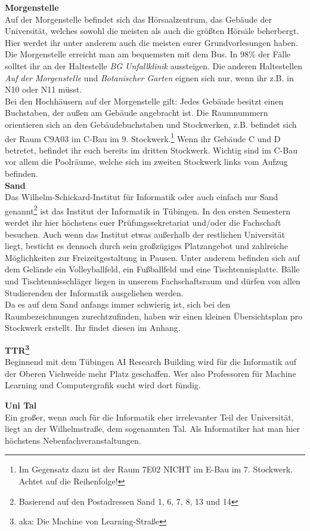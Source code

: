 \textbf{Morgenstelle}\\
Auf der Morgenstelle befindet sich das Hörsaalzentrum, das Gebäude der Universität, welches sowohl die meisten als auch die größten Hörsäle beherbergt. Hier werdet ihr unter anderem auch die meisten eurer Grundvorlesungen haben.\\
Die Morgenstelle erreicht man am bequemsten mit dem Bus. In 98\% der Fälle solltet ihr an der Haltestelle \emph{BG Unfallklinik} aussteigen. Die anderen Haltestellen \emph{Auf der Morgenstelle} und \emph{Botanischer Garten} eignen sich nur, wenn ihr z.B. in N10 oder N11 müsst.\\ Bei den Hochhäusern auf der Morgenstelle gilt: Jedes Gebäude besitzt einen Buchstaben, der außen am Gebäude angebracht ist.  Die Raumnummern orientieren sich an den Gebäudebuchstaben und Stockwerken, z.B. befindet sich der Raum C9A03 im C-Bau im 9. Stockwerk.\footnote{Im Gegensatz dazu ist der Raum 7E02 NICHT im E-Bau im 7. Stockwerk. Achtet auf die Reihenfolge!} Wenn ihr Gebäude C und D betretet, befindet ihr euch bereits im dritten Stockwerk. Wichtig sind im C-Bau vor allem die Poolräume, welche sich im zweiten Stockwerk links vom Aufzug befinden. \\

\textbf{Sand}\\
Das Wilhelm-Schickard-Institut für Informatik oder auch einfach nur Sand genannt\footnote{Basierend auf den Postadressen Sand 1, 6, 7, 8, 13 und 14} ist das Institut der Informatik in Tübingen. In den ersten Semestern werdet ihr hier höchstens euer Prüfungssekretariat und/oder die Fachschaft besuchen. Auch wenn das Institut etwas außerhalb der restlichen Universität liegt, besticht es dennoch durch sein großzügiges Platzangebot und zahlreiche Möglichkeiten zur Freizeitgestaltung in Pausen. Unter anderem befinden sich auf dem Gelände ein Volleyballfeld, ein Fußballfeld und eine Tischtennisplatte. Bälle und Tischtennisschläger liegen in unserem Fachschaftsraum und dürfen von allen Studierenden der Informatik ausgeliehen werden.\\
Da es auf dem Sand anfangs immer schwierig ist, sich bei den Raumbezeichnungen zurechtzufinden, haben wir einen kleinen Übersichtsplan pro Stockwerk erstellt. Ihr findet diesen im Anhang.

\textbf{TTR\footnote{aka: Die Machine von Learning-Straße}}\\
Beginnend mit dem Tübingen AI Research Building wird für die Informatik auf der Oberen Viehweide mehr Platz geschaffen. Wer also Professoren für Machine Learning und Computergrafik sucht wird dort fündig.

\textbf{Uni Tal}\\
Ein großer, wenn auch für die Informatik eher irrelevanter Teil der Universität, liegt an der Wilhelmstraße, dem sogenannten Tal. Als Informatiker hat man hier höchstens Nebenfachveranstaltungen.
\vfill
